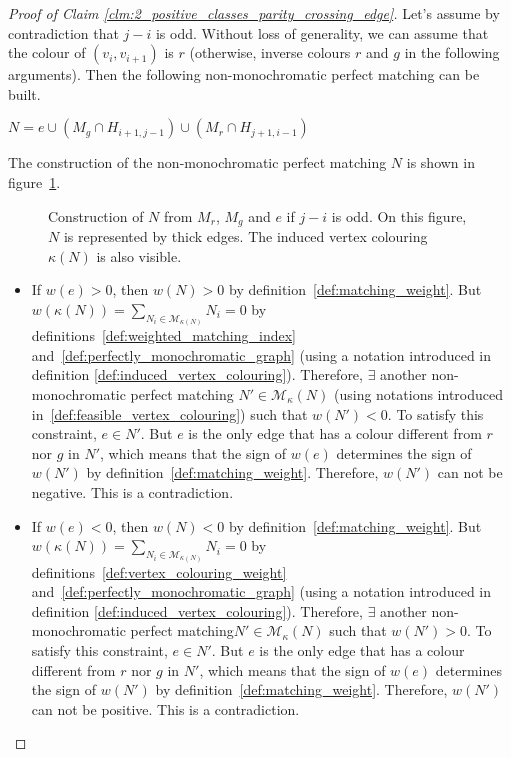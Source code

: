 \begin{proof}[Proof of Claim \ref{clm:2_positive_classes_parity_crossing_edge}]
    Let's assume by contradiction that $j-i$ is odd.
    Without loss of generality, we can assume that the colour of $(v_i, v_{i+1})$ is $r$ (otherwise, inverse colours $r$ and $g$ in the following arguments).
    Then the following non-monochromatic perfect matching can be built.

    \begin{center}
        $N = e \cup (M_g \cap H_{i+1, j-1}) \cup (M_r \cap H_{j+1, i-1})$
    \end{center}

    The construction of the non-monochromatic perfect matching $N$ is shown in figure~\ref{fig:2_pos_classes_odd_crossings}.

    \begin{figure}[H]
        \caption{Construction of $N$ from $M_r$, $M_g$ and $e$ if $j-i$ is odd.
            On this figure, $N$ is represented by thick edges.
            The induced vertex colouring $\kappa(N)$ is also visible.}
        \label{fig:2_pos_classes_odd_crossings}
    \end{figure}

    \begin{itemize}
        \item If $w(e) > 0$, then $w(N) > 0$ by definition~\ref{def:matching_weight}.
        But $w(\kappa(N)) = \sum\limits_{N_i \in \mathcal{M}_{\kappa(N)}} N_i = 0$ by definitions~\ref{def:weighted_matching_index} and~\ref{def:perfectly_monochromatic_graph} (using a notation introduced in definition \ref{def:induced_vertex_colouring}).
        Therefore, $\exists$ another non-monochromatic perfect matching $N' \in \mathcal{M}_\kappa(N)$ (using notations introduced in~\ref{def:feasible_vertex_colouring}) such that $w(N') < 0$.
        To satisfy this constraint, $e \in N'$.
        But $e$ is the only edge that has a colour different from $r$ nor $g$ in $N'$, which means that the sign of $w(e)$ determines the sign of $w(N')$ by definition~\ref{def:matching_weight}.
        Therefore, $w(N')$ can not be negative.
        This is a contradiction.

        \item If $w(e) < 0$, then $w(N) < 0$ by definition~\ref{def:matching_weight}.
        But $w(\kappa(N)) = \sum\limits_{N_i \in \mathcal{M}_{\kappa(N)}} N_i = 0$ by definitions~\ref{def:vertex_colouring_weight} and~\ref{def:perfectly_monochromatic_graph} (using a notation introduced in definition \ref{def:induced_vertex_colouring}).
        Therefore, $\exists$ another non-monochromatic perfect matching$N' \in \mathcal{M}_\kappa(N)$ such that $w(N') > 0$.
        To satisfy this constraint, $e \in N'$.
        But $e$ is the only edge that has a colour different from $r$ nor $g$ in $N'$, which means that the sign of $w(e)$ determines the sign of $w(N')$ by definition~\ref{def:matching_weight}.
        Therefore, $w(N')$ can not be positive.
        This is a contradiction.

    \end{itemize}
\end{proof}


